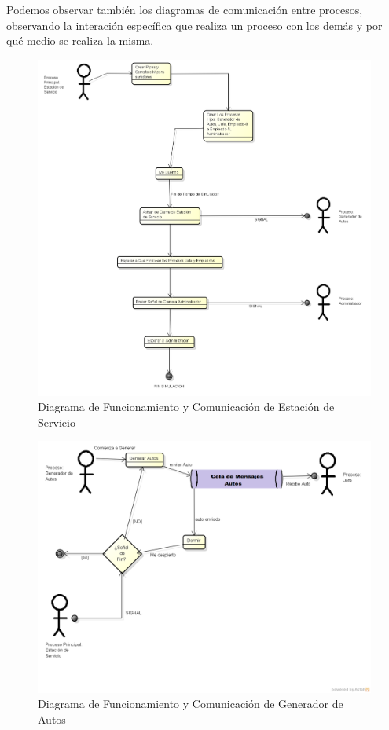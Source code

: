 \documentclass[a4paper,12pt]{article}
\begin{document}
	Podemos observar también los diagramas de comunicación entre procesos, observando la interación específica que realiza un proceso con los demás y por qué medio se realiza la misma.

\begin{figure}
\centering
\includegraphics[scale=0.45]{Diagramas/EstacionDeServicio.png}
\caption{Diagrama de Funcionamiento y Comunicación de Estación de Servicio}
\label{fig:EstacionDeServicio}
\end{figure}	

\begin{figure}
\centering
\includegraphics[scale=0.55]{Diagramas/GeneradorDeAutos.png} 
\caption{Diagrama de Funcionamiento y Comunicación de Generador de Autos}
\label{fig:GeneradorDeAutos}
\end{figure}	
\end{document}
